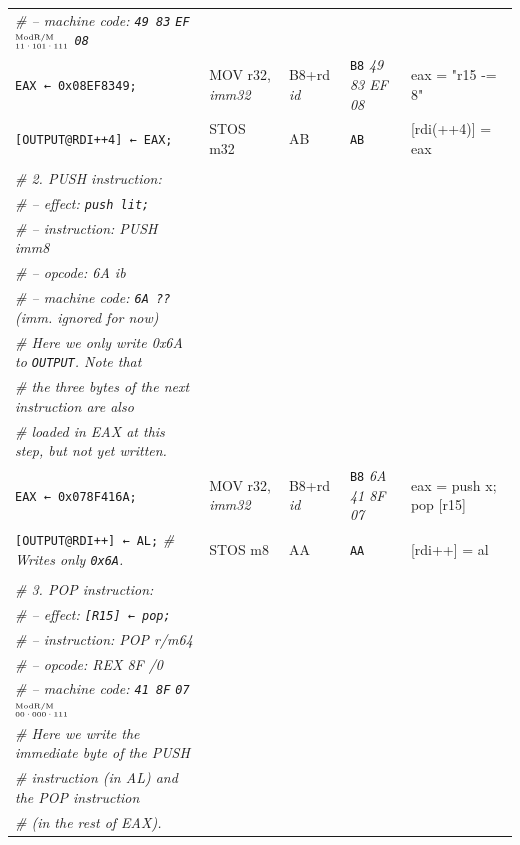 \documentclass[a4paper,12pt,final]{article}
\begin{document}
\begin{table}[!htbp]
\begin{adjustwidth}{-1cm}{-1cm}
\begin{center}
\begin{tabular}{l|ll|lH}
\emph{\# – machine code: \texttt{49 83} \texttt{EF}​\(^{\text{\tiny ModR/M}}_{\text{\tiny 11·101·111}}\) \texttt{08}} &  &  &  & \\[0pt]
\texttt{EAX ← 0x08EF8349;} & MOV r32, \emph{imm32} & B8+rd \emph{id} & \texttt{B8} \emph{49 83 EF 08} & eax = "r15 -= 8"\\[0pt]
\texttt{[OUTPUT@RDI++4] ← EAX;} & STOS m32 & AB & \texttt{AB} & [rdi(++4)] = eax\\[0pt]
 &  &  &  & \\[0pt]
\emph{\# 2. PUSH instruction:} &  &  &  & \\[0pt]
\emph{\# – effect: \texttt{push lit;}} &  &  &  & \\[0pt]
\emph{\# – instruction: PUSH imm8} &  &  &  & \\[0pt]
\emph{\# – opcode: 6A ib} &  &  &  & \\[0pt]
\emph{\# – machine code: \texttt{6A ??} (imm. ignored for now)} &  &  &  & \\[0pt]
\emph{\# Here we only write 0x6A to \texttt{OUTPUT}. Note that} &  &  &  & \\[0pt]
\emph{\# the three bytes of the next instruction are also} &  &  &  & \\[0pt]
\emph{\# loaded in EAX at this step, but not yet written.} &  &  &  & \\[0pt]
\texttt{EAX ← 0x078F416A;} & MOV r32, \emph{imm32} & B8+rd \emph{id} & \texttt{B8} \emph{6A 41 8F 07} & eax = push x; pop [r15]\\[0pt]
\texttt{[OUTPUT@RDI++] ← AL;}  \emph{\# Writes only \texttt{0x6A}.} & STOS m8 & AA & \texttt{AA} & [rdi++] = al\\[0pt]
 &  &  &  & \\[0pt]
\emph{\# 3. POP instruction:} &  &  &  & \\[0pt]
\emph{\# – effect: \texttt{[R15] ← pop;}} &  &  &  & \\[0pt]
\emph{\# – instruction: POP r/m64} &  &  &  & \\[0pt]
\emph{\# – opcode: REX 8F /0} &  &  &  & \\[0pt]
\emph{\# – machine code: \texttt{41 8F} \texttt{07}​\(^{\text{\tiny ModR/M}}_{\text{\tiny 00·000·111}}\)} &  &  &  & \\[0pt]
\emph{\# Here we write the immediate byte of the PUSH} &  &  &  & \\[0pt]
\emph{\# instruction (in AL) and the POP instruction} &  &  &  & \\[0pt]
\emph{\# (in the rest of EAX).} &  &  &  & \\[0pt]

\end{tabular}
\end{center}
\end{adjustwidth}
\end{table}
\end{document}
